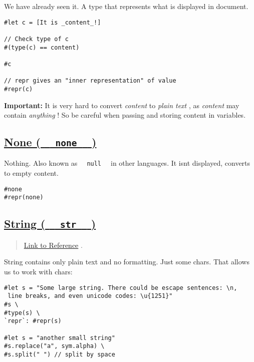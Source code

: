 We have already seen it. A type that represents what is displayed in
document.

\begin{verbatim}
#let c = [It is _content_!]

// Check type of c
#(type(c) == content)

#c

// repr gives an "inner representation" of value
#repr(c)
\end{verbatim}

\pandocbounded{}

\textbf{Important:} It is very hard to convert \emph{content} to
\emph{plain text} , as \emph{content} may contain \emph{anything} ! So
be careful when passing and storing content in variables.

\subsection{\texorpdfstring{\hyperref[none-none]{None (
\texttt{\ }{\texttt{\ none\ }}\texttt{\ }
)}}{None (   none   )}}\label{none-none}

Nothing. Also known as \texttt{\ }{\texttt{\ null\ }}\texttt{\ } in
other languages. It isn\textquotesingle t displayed, converts to empty
content.

\begin{verbatim}
#none
#repr(none)
\end{verbatim}

\pandocbounded{}

\subsection{\texorpdfstring{\hyperref[string-str]{String (
\texttt{\ }{\texttt{\ str\ }}\texttt{\ }
)}}{String (   str   )}}\label{string-str}

\begin{quote}
\href{https://typst.app/docs/reference/foundations/str/}{Link to
Reference} .
\end{quote}

String contains only plain text and no formatting. Just some chars. That
allows us to work with chars:

\begin{verbatim}
#let s = "Some large string. There could be escape sentences: \n,
 line breaks, and even unicode codes: \u{1251}"
#s \
#type(s) \
`repr`: #repr(s)

#let s = "another small string"
#s.replace("a", sym.alpha) \
#s.split(" ") // split by space
\end{verbatim}

